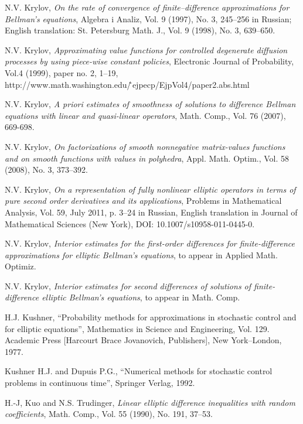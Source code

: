 \documentclass[11pt, reqno]{amsart}
\theoremstyle{definition}
\theoremstyle{remark}
\begin{document}
\begin{thebibliography}{mm}
 N.V. Krylov,  {\em On the rate of convergence
of finite--difference approximations for Bellman's equations\/},
 Algebra i Analiz,  
 Vol. 9 (1997), No. 3, 245--256 in Russian;
English translation: St. Petersburg Math. J.,
Vol. 9 (1998), No. 3, 639--650.

 N.V. Krylov, {\em Approximating
value functions for  controlled degenerate diffusion
processes by using piece-wise constant policies},
Electronic Journal of Probability, Vol.4 (1999), paper no. 2, 1--19,\\
http://www.math.washington.edu/\~\,ejpecp/EjpVol4/paper2.abs.html

 N.V. Krylov, {\em A priori estimates
of smoothness of solutions to  difference  Bellman  equations 
  with linear and quasi-linear operators\/}, 
Math. Comp., Vol. 76 (2007), 669-698. 

 N.V. Krylov, {\em On
factorizations of smooth nonnegative matrix-values
functions and on
smooth functions with values in polyhedra\/},
  Appl. Math. Optim., Vol. 58 (2008), No. 3, 373--392.

 N.V. Krylov,  {\em On a representation of fully nonlinear elliptic
operators in terms of pure
second order derivatives and its applications\/}, 
Problems in Mathematical Analysis, Vol.
 59, July 2011, p. 3--24 in Russian,
English translation in Journal of
Mathematical Sciences (New York),
DOI: 10.1007/s10958-011-0445-0.

 N.V. Krylov, {\em Interior estimates for 
the first-order differences
for finite-difference
  approximations for elliptic Bellman's
equations\/}, to appear in Applied Math. Optimiz.

 N.V. Krylov, {\em Interior estimates for second differences 
  of solutions of finite-difference elliptic Bellman's 
equations\/}, to appear in Math. Comp.

 H.J. Kushner, ``Probability methods for 
approximations
in stochastic control and for elliptic equations'', 
Mathematics in Science
and Engineering, Vol. 129. Academic Press [Harcourt 
Brace Jovanovich,
Publishers], New York--London, 1977.

 Kushner  H.J. and
 Dupuis  P.G., ``Numerical methods
for stochastic control problems
in continuous time'',
Springer Verlag, 1992.

 H.-J,  Kuo and N.S. Trudinger,
{\em Linear elliptic difference inequalities with random coefficients\/},
Math. Comp., Vol. 55 (1990), No. 191, 37--53.


\end{thebibliography}
\end{document}
